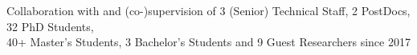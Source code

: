 
\newcommand{\supervision}[3]{\textbf{#1} (In own group, #2). {\small #3}}
\newcommand{\cosupervision}[4]{\textbf{#1} (#2, #3, co-supervision). {\small #4}}

        {
        \hspace*{\fill} Collaboration with and (co-)supervision of 3 (Senior) Technical Staff, 2 PostDocs, 32 PhD Students,\\
        \hspace*{\fill} 40+ Master's Students, 3 Bachelor's Students and 9 Guest Researchers since 2017
        }
%
%
%
%
